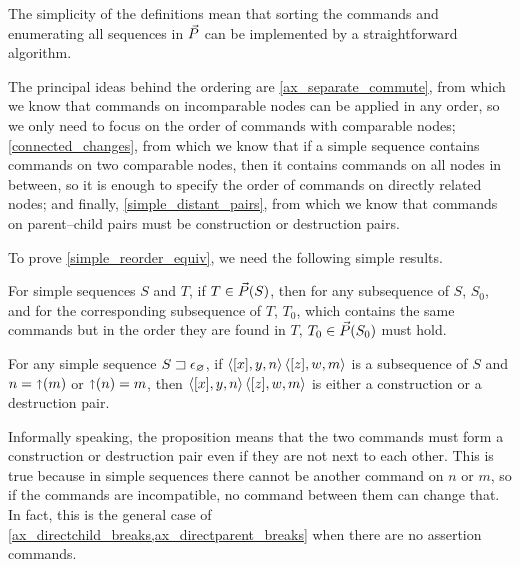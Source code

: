 The simplicity of the definitions mean that sorting the commands
and enumerating
all sequences in $\vec{P}$ can be implemented by a straightforward
algorithm.

The principal ideas behind the ordering are 
\cref{ax_separate_commute}, from which we know that commands on incomparable
nodes can be applied in any order, so we only need to focus on the order of commands
with comparable nodes;
\cref{connected_changes}, from which we know that if a simple sequence contains commands on two comparable
nodes, then it contains commands on all nodes in between, so it is enough to specify
the order of commands on directly related nodes;
and finally, \cref{simple_distant_pairs}, from which we know
that commands on parent--child pairs must be construction or destruction pairs.

To prove \cref{simple_reorder_equiv}, we need the following simple results.

\begin{mycor}
For simple sequences $S$ and $T$,
if $T\in\vec{P}({S})$, then for any subsequence of $S$, $S_0$,
and for the corresponding subsequence of $T$, $T_0$, which
contains the same commands but in the order they are found in $T$,
$T_0\in\vec{P}({S_0})$ must hold.
\end{mycor}



\begin{mylem}
For any simple sequence ${S}\sqsupset\epsilon_\varnothing$,
if $\langle{[x],y,n}\rangle\,\langle{[z],w,m}\rangle$ is a subsequence of $S$ and $n=\mathord{\shortuparrow}(m)$ or $\mathord{\shortuparrow}(n)=m$,
then $\langle{[x],y,n}\rangle\,\langle{[z],w,m}\rangle$ is either a construction or a destruction pair.
\end{mylem}

Informally speaking, the proposition means that
the two commands must form a construction or destruction pair even
if they are not next to each other.
This is true because in simple sequences
there cannot be another command on $n$ or $m$,
so if the commands are incompatible, no command between them can change that.
In fact, this  is the general case
of \cref{ax_directchild_breaks,ax_directparent_breaks} when there are no assertion commands.


